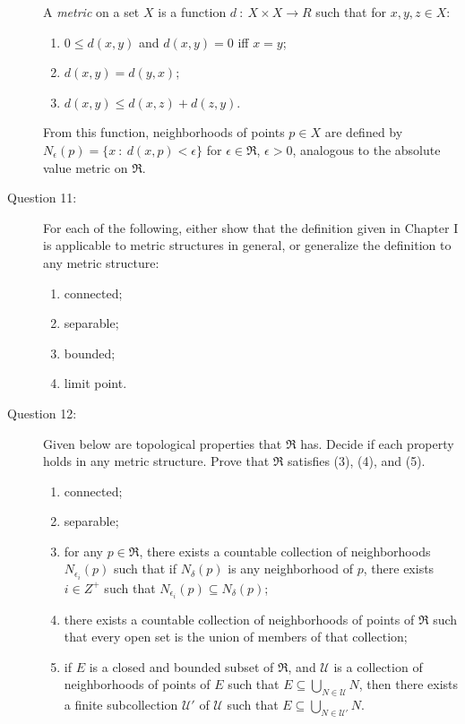 \documentclass{article}
\begin{document}
\begin{description}

  \item[] A \emph{metric} on a set $X$ is a function $d\ :\ X \times X \rightarrow R$ such that for $x,y,z \in X:$
    \begin{enumerate}[\hspace{1cm}(1)]
      \item $0 \leq d(x,y)$ and $d(x,y) = 0$ iff $x = y$; 
      \item $d(x,y) = d(y,x)$; 
      \item $d(x,y) \leq d(x,z) + d(z,y)$.
    \end{enumerate}
    From this function, neighborhoods of points $p \in X$ are defined by $N_\epsilon (p) = \{ x\ :\ d(x,p) < \epsilon \}$ for $\epsilon \in \Re$, $\epsilon > 0$, analogous to the absolute value metric on $\Re$.

  \item[Question 11:] For each of the following, either show that the definition given in Chapter I is applicable to metric structures in general, or generalize the definition to any metric structure:
    \begin{enumerate}[\hspace{1cm}(1)]
      \item connected;
      \item separable;
      \item bounded;
      \item limit point.
    \end{enumerate}

  \item[Question 12:] Given below are topological properties that $\Re$ has. Decide if each property holds in any metric structure. Prove that $\Re$ satisfies (3), (4), and (5).
    \begin{enumerate}[\hspace{1cm}(1)]
      \item connected;
      \item separable;
      \item for any $p \in \Re$, there exists a countable collection of neighborhoods $N_{\epsilon_{i}} (p)$ such that if $N_\delta (p)$ is any neighborhood of $p$, there exists $i \in Z^+$ such that $N_{\epsilon_{i}} (p) \subseteq N_\delta (p)$;
      \item there exists a countable collection of neighborhoods of points of $\Re$ such that every open set is the union of members of that collection;
      \item if $E$ is a closed and bounded subset of $\Re$, and $\mathcal{U}$ is a collection of neighborhoods of points of $E$ such that $\displaystyle E \subseteq \bigcup_{N \in \mathcal{U}} N$, then there exists a finite subcollection $\mathcal{U}'$ of $\mathcal{U}$ such that $\displaystyle E \subseteq \bigcup_{N \in \mathcal{U}'} N$.
    \end{enumerate}

\end{description}
\end{document}
